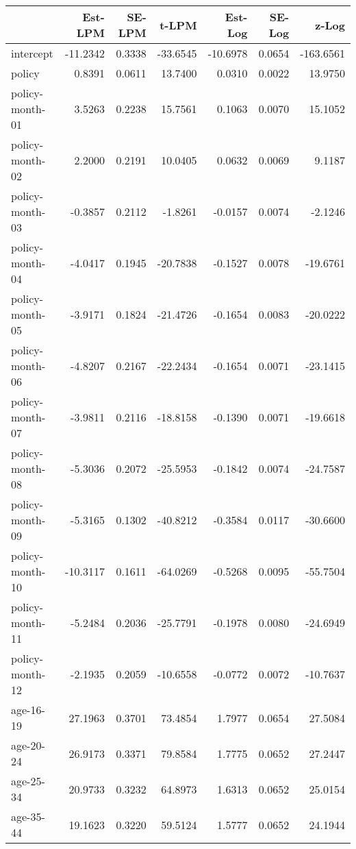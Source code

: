\documentclass[10pt]{article}
\begin{document}
\clearpage
\pagebreak




\begin{table}[ht]
\centering
\begin{tabular}{lrrrrrr}
  \hline
 & Est-LPM & SE-LPM & t-LPM & Est-Log & SE-Log & z-Log \\ 
  \hline
intercept & -11.2342 & 0.3338 & -33.6545 & -10.6978 & 0.0654 & -163.6561 \\ 
  policy & 0.8391 & 0.0611 & 13.7400 & 0.0310 & 0.0022 & 13.9750 \\ 
  policy-month-01 & 3.5263 & 0.2238 & 15.7561 & 0.1063 & 0.0070 & 15.1052 \\ 
  policy-month-02 & 2.2000 & 0.2191 & 10.0405 & 0.0632 & 0.0069 & 9.1187 \\ 
  policy-month-03 & -0.3857 & 0.2112 & -1.8261 & -0.0157 & 0.0074 & -2.1246 \\ 
  policy-month-04 & -4.0417 & 0.1945 & -20.7838 & -0.1527 & 0.0078 & -19.6761 \\ 
  policy-month-05 & -3.9171 & 0.1824 & -21.4726 & -0.1654 & 0.0083 & -20.0222 \\ 
  policy-month-06 & -4.8207 & 0.2167 & -22.2434 & -0.1654 & 0.0071 & -23.1415 \\ 
  policy-month-07 & -3.9811 & 0.2116 & -18.8158 & -0.1390 & 0.0071 & -19.6618 \\ 
  policy-month-08 & -5.3036 & 0.2072 & -25.5953 & -0.1842 & 0.0074 & -24.7587 \\ 
  policy-month-09 & -5.3165 & 0.1302 & -40.8212 & -0.3584 & 0.0117 & -30.6600 \\ 
  policy-month-10 & -10.3117 & 0.1611 & -64.0269 & -0.5268 & 0.0095 & -55.7504 \\ 
  policy-month-11 & -5.2484 & 0.2036 & -25.7791 & -0.1978 & 0.0080 & -24.6949 \\ 
  policy-month-12 & -2.1935 & 0.2059 & -10.6558 & -0.0772 & 0.0072 & -10.7637 \\ 
  age-16-19 & 27.1963 & 0.3701 & 73.4854 & 1.7977 & 0.0654 & 27.5084 \\ 
  age-20-24 & 26.9173 & 0.3371 & 79.8584 & 1.7775 & 0.0652 & 27.2447 \\ 
  age-25-34 & 20.9733 & 0.3232 & 64.8973 & 1.6313 & 0.0652 & 25.0154 \\ 
  age-35-44 & 19.1623 & 0.3220 & 59.5124 & 1.5777 & 0.0652 & 24.1944 \\ 

\end{tabular}
\end{table}
\end{document}
